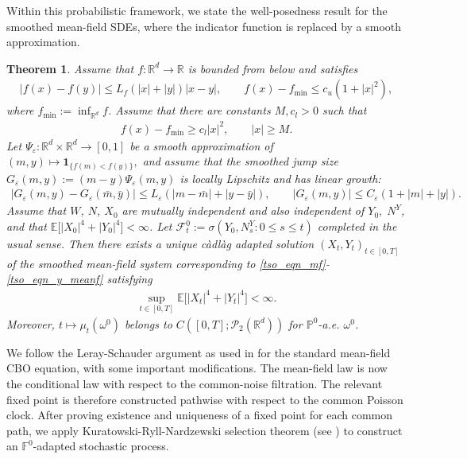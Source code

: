 \documentclass{article}
\newtheorem{theorem}{Theorem}[section]
\numberwithin{equation}{section}
\begin{document}
Within this probabilistic framework, we state the well-posedness result for the smoothed mean-field SDEs, where the indicator function is replaced by a smooth approximation.

\begin{theorem}
  Assume that $f:\mathbb R^d\to\mathbb R$ is bounded from below and satisfies
\begin{align}\label{tso_eqn_f_lowerbnd_2.14}
|f(x)-f(y)|\le L_f(|x|+|y|)|x-y|,\qquad
f(x)- f_{\min}\le c_u(1+|x|^2),
\end{align}
where $f_{\min} := \inf_{\mathbb R^d}f$. Assume that there are constants $M,c_l>0$ such that 
\begin{align}\label{tso_eqn_f_lowerbnd_2.15}
f(x)- f_{\min} \geq c_l |x|^2,\qquad |x|\ge M.
\end{align}
Let $\Psi_\varepsilon:\mathbb R^d\times\mathbb R^d\to[0,1]$ be a smooth approximation of
$
(m,y)\longmapsto \mathbf 1_{\{f(m)<f(y)\}},
$
and assume that the smoothed jump size  $G_\varepsilon(m,y):=(m-y)\Psi_\varepsilon(m,y)
$
is locally Lipschitz and has linear growth:
\begin{align}
|G_\varepsilon(m,y)-G_\varepsilon(\bar m,\bar y)| \le L_\varepsilon(|m-\bar m|+|y-\bar y|),\qquad
|G_\varepsilon(m,y)|\le C_\varepsilon(1+|m|+|y|).
\end{align}
Assume that $W$, $N$, $X_0$ are mutually independent and also independent of $Y_0, \; N^Y$, and that $ \mathbb E\bigl[|X_0|^4+|Y_0|^4\bigr]<\infty$. 
Let $\mathcal{F}^0_t:=\sigma(Y_0,N_s^Y:0\leq s\le t)$
completed in the usual sense. Then there exists a unique c\`{a}dl\`{a}g adapted solution
$(X_t,Y_t)_{t\in[0,T]}$ of the smoothed mean-field system corresponding to \eqref{tso_eqn_mf}-\eqref{tso_eqn_y_meanf} satisfying
\begin{align}
    \sup_{t\in[0,T]}
    \mathbb E\bigl[|X_t|^4+|Y_t|^4\bigr]<\infty.
\end{align}
Moreover, $t\mapsto\mu_t (\omega^0)$ belongs to $C([0,T];\mathcal P_2(\mathbb R^d))$ for $\mathbb P^0$-a.e. $\omega^0$.
\end{theorem}

 We follow the Leray-Schauder argument as used in \cite{carrillo2018analytical} for the standard mean-field CBO equation, with some important modifications. The mean-field law is now the conditional law with respect to the common-noise filtration. The relevant fixed point is therefore constructed pathwise with respect to the common Poisson clock. After proving existence and uniqueness of a fixed point for each common path, we apply Kuratowski-Ryll-Nardzewski selection theorem (see \cite{ch1977convex}) to construct an $\mathbb{F}^0$-adapted stochastic process. 
\end{document}
